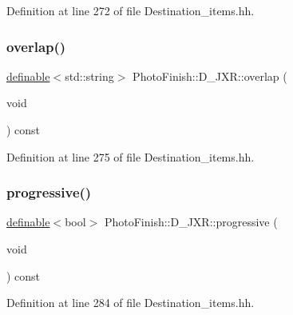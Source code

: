Definition at line 272 of file Destination\+\_\+items.\+hh.

\mbox{\label{class_photo_finish_1_1_d___j_x_r_ac0f2bc07bf26e54fb3504982631a3cfb}} 
\subsubsection{\texorpdfstring{overlap()}{overlap()}}
{\footnotesize\ttfamily \hyperlink{class_photo_finish_1_1definable}{definable}$<$std\+::string$>$ Photo\+Finish\+::\+D\+\_\+\+J\+X\+R\+::overlap (\begin{DoxyParamCaption}\item[{void}]{ }\end{DoxyParamCaption}) const\hspace{0.3cm}{\ttfamily [inline]}}



Definition at line 275 of file Destination\+\_\+items.\+hh.

\mbox{\label{class_photo_finish_1_1_d___j_x_r_a99c043e825ad8bc5d96dfe5b2de083c7}} 
\subsubsection{\texorpdfstring{progressive()}{progressive()}}
{\footnotesize\ttfamily \hyperlink{class_photo_finish_1_1definable}{definable}$<$bool$>$ Photo\+Finish\+::\+D\+\_\+\+J\+X\+R\+::progressive (\begin{DoxyParamCaption}\item[{void}]{ }\end{DoxyParamCaption}) const\hspace{0.3cm}{\ttfamily [inline]}}



Definition at line 284 of file Destination\+\_\+items.\+hh.

\mbox{\label{class_photo_finish_1_1_d___j_x_r_aa830c448b69529f9d823e4f0e12d7b01}} 
